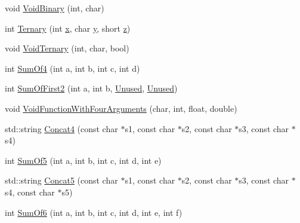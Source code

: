 \begin{DoxyCompactItemize}
\item 
void \mbox{\hyperlink{namespacetesting_1_1gmock__more__actions__test_aec71bd163ae67ec97e073bd13a4ac039}{Void\+Binary}} (int, char)
\item 
int \mbox{\hyperlink{namespacetesting_1_1gmock__more__actions__test_ab98b352528a0b72625b4710a6fc648a1}{Ternary}} (int \mbox{\hyperlink{_obj__test_2lib_2googletest-master_2googlemock_2test_2gmock-matchers__test_8cc_a6150e0515f7202e2fb518f7206ed97dc}{x}}, char \mbox{\hyperlink{_obj__test_2lib_2googletest-master_2googlemock_2test_2gmock-matchers__test_8cc_a39cb44155237f0205e0feb931d5acbed}{y}}, short \mbox{\hyperlink{_obj__test_2lib_2googletest-master_2googlemock_2test_2gmock-matchers__test_8cc_a196ff6a287f53f758b1506f21269fc77}{z}})
\item 
void \mbox{\hyperlink{namespacetesting_1_1gmock__more__actions__test_ac41b49dc8ab365ccad7b332796421cd4}{Void\+Ternary}} (int, char, bool)
\item 
int \mbox{\hyperlink{namespacetesting_1_1gmock__more__actions__test_a41c348fff8608825239a276b8426a475}{Sum\+Of4}} (int a, int b, int c, int d)
\item 
int \mbox{\hyperlink{namespacetesting_1_1gmock__more__actions__test_aaa60ddffb96ddc3a73b0b22929ca5bec}{Sum\+Of\+First2}} (int a, int b, \mbox{\hyperlink{namespacetesting_a603e329ec0263ebfcf16f712810bd511}{Unused}}, \mbox{\hyperlink{namespacetesting_a603e329ec0263ebfcf16f712810bd511}{Unused}})
\item 
void \mbox{\hyperlink{namespacetesting_1_1gmock__more__actions__test_a8c952be61635486e84c1eca3bf3acd9b}{Void\+Function\+With\+Four\+Arguments}} (char, int, float, double)
\item 
std\+::string \mbox{\hyperlink{namespacetesting_1_1gmock__more__actions__test_a753ab28ecaa4133f11f9e34441b04595}{Concat4}} (const char $\ast$s1, const char $\ast$s2, const char $\ast$s3, const char $\ast$s4)
\item 
int \mbox{\hyperlink{namespacetesting_1_1gmock__more__actions__test_a38e64569bf08e83c6db22c1fb0fe0af6}{Sum\+Of5}} (int a, int b, int c, int d, int e)
\item 
std\+::string \mbox{\hyperlink{namespacetesting_1_1gmock__more__actions__test_ad96d89b9c9dd13ef8df8114e4b430e96}{Concat5}} (const char $\ast$s1, const char $\ast$s2, const char $\ast$s3, const char $\ast$s4, const char $\ast$s5)
\item 
int \mbox{\hyperlink{namespacetesting_1_1gmock__more__actions__test_a139632d344348fdfa25111d4e43f70ba}{Sum\+Of6}} (int a, int b, int c, int d, int e, int f)

\end{DoxyCompactItemize}
